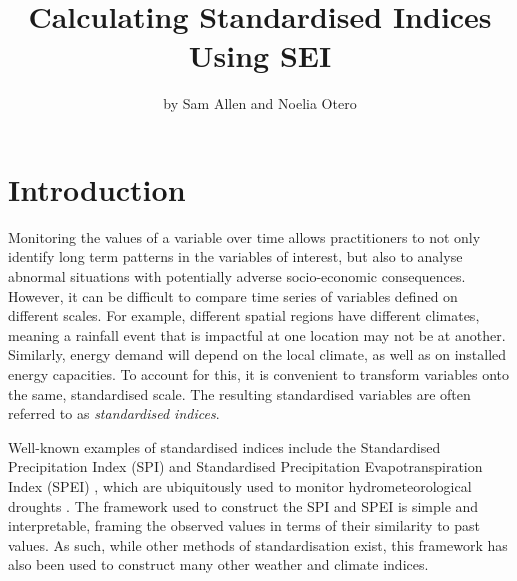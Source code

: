 \title{Calculating Standardised Indices Using SEI}


\author{by Sam Allen and Noelia Otero}

\maketitle


\hypertarget{introduction}{%
\section{Introduction}\label{introduction}}

Monitoring the values of a variable over time allows practitioners to not only identify long term patterns in the variables of interest, but also to analyse abnormal situations with potentially adverse socio-economic consequences. However, it can be difficult to compare time series of variables defined on different scales. For example, different spatial regions have different climates, meaning a rainfall event that is impactful at one location may not be at another. Similarly, energy demand will depend on the local climate, as well as on installed energy capacities. To account for this, it is convenient to transform variables onto the same, standardised scale. The resulting standardised variables are often referred to as \emph{standardised indices}.

Well-known examples of standardised indices include the Standardised Precipitation Index (SPI) \citep{MckeeEtAl1993} and Standardised Precipitation Evapotranspiration Index (SPEI) \citep{VicenteEtAl2010}, which are ubiquitously used to monitor hydrometeorological droughts \citep{BegueriaEtAl2014}. The framework used to construct the SPI and SPEI is simple and interpretable, framing the observed values in terms of their similarity to past values. As such, while other methods of standardisation exist, this framework has also been used to construct many other weather and climate indices.

